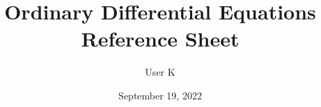 \documentclass[10pt, letterpaper]{article}
\title{Ordinary Differential Equations Reference Sheet}
\author{User K}
\date{September 19, 2022}
\begin{document}
\begin{comment}
\begin{titlepage}
    \maketitle
\end{titlepage}
\end{comment}





\end{document}
